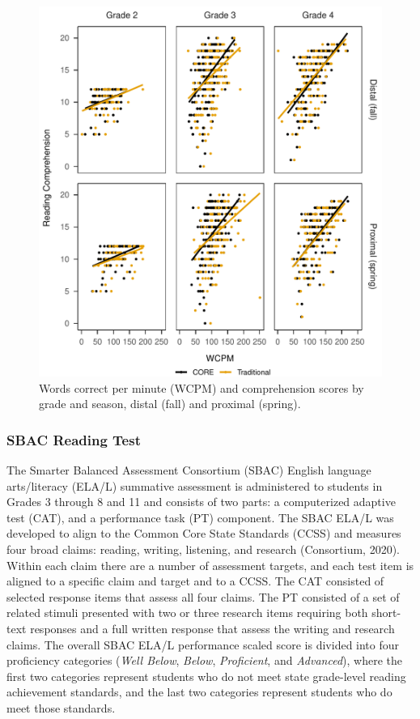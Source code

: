 \documentclass[
  english,
  man, fleqn, noextraspace]{apa6}
\begin{document}
\begin{figure}
\centering
\includegraphics{conseq_validity_manusript_files/figure-latex/fig-comp-scatter-1.pdf}
\caption{\label{fig:fig-comp-scatter}Words correct per minute (WCPM) and comprehension scores by grade and season, distal (fall) and proximal (spring).}
\end{figure}

\hypertarget{sbac-reading-test}{%
\subsubsection{SBAC Reading Test}\label{sbac-reading-test}}

The Smarter Balanced Assessment Consortium (SBAC) English language arts/literacy (ELA/L) summative assessment is administered to students in Grades 3 through 8 and 11 and consists of two parts: a computerized adaptive test (CAT), and a performance task (PT) component. The SBAC ELA/L was developed to align to the Common Core State Standards (CCSS) and measures four broad claims: reading, writing, listening, and research (Consortium, 2020). Within each claim there are a number of assessment targets, and each test item is aligned to a specific claim and target and to a CCSS. The CAT consisted of selected response items that assess all four claims. The PT consisted of a set of related stimuli presented with two or three research items requiring both short-text responses and a full written response that assess the writing and research claims. The overall SBAC ELA/L performance scaled score is divided into four proficiency categories (\emph{Well Below}, \emph{Below}, \emph{Proficient}, and \emph{Advanced}), where the first two categories represent students who do not meet state grade-level reading achievement standards, and the last two categories represent students who do meet those standards.
\end{document}
